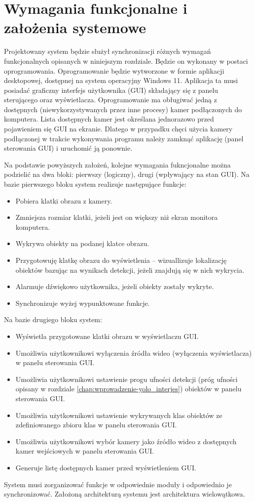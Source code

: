 \section{Wymagania funkcjonalne i założenia systemowe}
Projektowany system będzie służył synchronizacji różnych wymagań funkcjonalnych opisanych w niniejszym rozdziale. Będzie on wykonany w postaci oprogramowania. 
Oprogramowanie będzie wytworzone w formie aplikacji desktopowej, dostępnej na system operacyjny Windows 11. Aplikacja ta musi posiadać graficzny interfejs użytkownika (GUI) składający się z panelu sterującego oraz wyświetlacza. 
Oprogramowanie ma obługiwać jedną z dostępnych (niewykorzystywanych przez inne procesy) kamer podłączonych do komputera. Lista dostępnych kamer jest określana jednorazowo przed pojawieniem się GUI na ekranie. Dlatego w przypadku chęci użycia kamery podłączonej w trakcie wykonywania programu należy zamknąć aplikację (panel sterowania GUI) i uruchomić ją ponownie.

Na podstawie powyższych założeń, kolejne wymagania fukncjonalne można podzielić na dwa bloki: pierwszy (logiczny), drugi (wpływający na stan GUI). Na bazie pierwszego bloku system realizuje następujące funkcje:
\begin{itemize}
    \item Pobiera klatki obrazu z kamery.
    \item Zmniejsza rozmiar klatki, jeżeli jest on większy niż ekran monitora komputera.
    \item Wykrywa obiekty na podanej klatce obrazu.
    \item Przygotowuję klatkę obrazu do wyświetlenia -- wizuallizuje lokalizację obiektów bazując na wynikach detekcji, jeżeli znajdują się w nich wykrycia.
    \item Alarmuje dźwiękowo użytkownika, jeżeli obiekty zostały wykryte.
    \item Synchronizuje wyżej wypunktowane funkcje.
\end{itemize}

Na bazie drugiego bloku system:
\begin{itemize}
        \item Wyświetla przygotowane klatki obrazu w wyświetlaczu GUI.
        \item Umożliwia użytkownikowi wyłączenia źródła wideo (wyłączenia wyświetlacza) w panelu sterowania GUI.
        \item Umożliwia użytkownikowi ustawienie progu ufności detekcji (próg ufności opisany w rozdziale \ref{chap:wprowadzenie-yolo_interjes}) obiektów w panelu sterowania GUI.
        \item Umożliwia użytkownikowi ustawienie wykrywanych klas obiektów ze zdefiniowanego zbioru klas w panelu sterowania GUI.
        \item Umożliwia użytkownikowi wybór kamery jako źródło wideo z dostępnych kamer wejściowych w panelu sterowania GUI.
        \item Generuje listę dostępnych kamer przed wyświetleniem GUI.
\end{itemize}

System musi zorganizować funkcje w odpowiednie moduły i odpowiednio je synchronizować. Założoną architekturą systemu jest architektura wielowątkowa. 